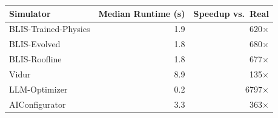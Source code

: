 \begin{tabular}{lrr}
\toprule
Simulator & Median Runtime (s) & Speedup vs.\ Real \\
\midrule
BLIS-Trained-Physics & 1.9 & 620$\times$ \\
BLIS-Evolved & 1.8 & 680$\times$ \\
BLIS-Roofline & 1.8 & 677$\times$ \\
Vidur & 8.9 & 135$\times$ \\
LLM-Optimizer & 0.2 & 6797$\times$ \\
AIConfigurator & 3.3 & 363$\times$ \\
\bottomrule
\end{tabular}